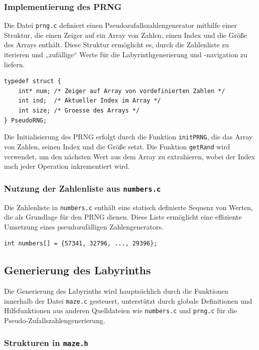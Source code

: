 \subsubsection{Implementierung des PRNG}

Die Datei \texttt{prng.c} definiert einen Pseudozufallszahlengenerator mithilfe einer Struktur, die einen Zeiger auf ein Array von Zahlen, einen Index und die Größe des Arrays enthält. Diese Struktur ermöglicht es, durch die Zahlenliste zu iterieren und „zufällige“ Werte für die Labyrinthgenerierung und -navigation zu liefern.

\begin{lstlisting}[style=CStyle]
typedef struct {
    int* num; /* Zeiger auf Array von vordefinierten Zahlen */
    int ind;  /* Aktueller Index im Array */
    int size; /* Groesse des Arrays */
} PseudoRNG;
\end{lstlisting}

Die Initialisierung des PRNG erfolgt durch die Funktion \texttt{initPRNG}, die das Array von Zahlen, seinen Index und die Größe setzt. Die Funktion \texttt{getRand} wird verwendet, um den nächsten Wert aus dem Array zu extrahieren, wobei der Index nach jeder Operation inkrementiert wird.

\subsubsection{Nutzung der Zahlenliste aus \texttt{numbers.c}}

Die Zahlenliste in \texttt{numbers.c} enthält eine statisch definierte Sequenz von Werten, die als Grundlage für den PRNG dienen. Diese Liste ermöglicht eine effiziente Umsetzung eines pseudozufälligen Zahlengenerators.

\begin{lstlisting}[style=CStyle]
int numbers[] = {57341, 32796, ..., 29396};
\end{lstlisting}

\subsection{Generierung des Labyrinths}

Die Generierung des Labyrinths wird hauptsächlich durch die Funktionen innerhalb der Datei \texttt{maze.c} gesteuert, unterstützt durch globale Definitionen und Hilfsfunktionen aus anderen Quelldateien wie \texttt{numbers.c} und \texttt{prng.c} für die Pseudo-Zufallszahlengenerierung.

\subsubsection{Strukturen in \texttt{maze.h}}

